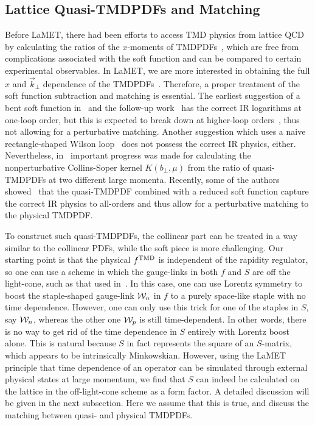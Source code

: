 \documentclass[aps,rmp,reprint,amsmath,amssymb,graphicx,longbibliography]{revtex4-1} %
\begin{document}


\subsection{Lattice Quasi-TMDPDFs and Matching}
\label{sec:quasitmd}
Before LaMET, there had been efforts to access TMD physics from lattice QCD by calculating the ratios of the $x$-moments of TMDPDFs~\cite{Hagler:2009mb,Musch:2010ka,Musch:2011er,Engelhardt:2015xja,Yoon:2017qzo}, which are free from complications associated with the soft function and can be compared to certain experimental observables. In LaMET, we are more interested in obtaining the full $x$ and $\vec{k}_\perp$ dependence of the TMDPDFs~\cite{Ji:2014hxa,Ji:2018hvs,Ebert:2018gzl,Ebert:2019okf,Ji:2019sxk,Ji:2019ewn}. Therefore, a proper treatment of the soft function subtraction and matching is essential.
The earliest suggestion of a bent soft function in~\cite{Ji:2014hxa} and the follow-up work~\cite{Ebert:2019okf} has the correct IR logarithms at one-loop order, but this is expected to break down at higher-loop orders~\cite{Ji:2019sxk}, thus not allowing for a perturbative matching. Another suggestion which uses a naive rectangle-shaped Wilson loop~\cite{Ji:2018hvs,Ebert:2019okf} does not possess the correct IR physics, either. Nevertheless, in~\cite{Ebert:2018gzl} important progress was made for calculating the nonperturbative
Collins-Soper kernel $K(b_\perp,\mu)$ from the ratio of quasi-TMDPDFs at two different large momenta.
Recently, some of the authors showed~\cite{Ji:2019sxk,Ji:2019ewn} that the quasi-TMDPDF combined with a reduced soft function capture the correct IR physics to all-orders and thus allow for a perturbative matching to the physical TMDPDF.

To construct such quasi-TMDPDFs, the collinear part can be treated in a way similar to the collinear PDFs, while the soft
piece is more challenging. Our starting point is that the physical $f^{\rm TMD}$ is independent of the rapidity regulator, so one can use a scheme in which the gauge-links in both $f$ and $S$
are off the light-cone, such as that used in~\cite{Collins:2011zzd}. In this case, one can use Lorentz symmetry to
boost the staple-shaped gauge-link ${\cal W}_n$ in $f$ to a purely space-like staple
with no time dependence. However, one can only use
this trick for one of the staples in $S$, say ${\cal W}_n$, whereas the other one
${\cal W}_p$ is still time-dependent. In other words, there is no way to get rid of the time dependence
in $S$ entirely with Lorentz boost alone. This is natural because $S$ in fact represents the square of
an $S$-matrix, which appears to be intrinsically Minkowskian. However, using the LaMET principle that time
dependence of an operator can be simulated through external physical states at large momentum, we find that
$S$ can indeed be calculated on the lattice in the off-light-cone scheme as a form factor. A detailed discussion will be given in
the next subsection. Here we assume that this is true, and discuss the matching between
quasi- and physical TMDPDFs.
\end{document}
